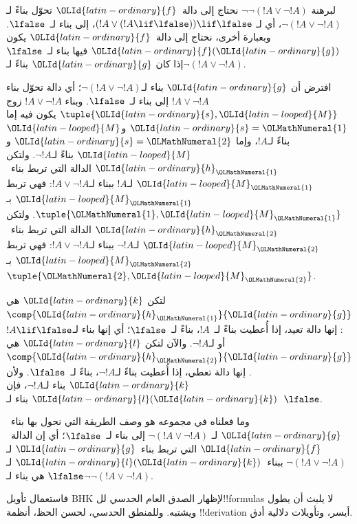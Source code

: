 \documentclass[../../../include/open-logic-section]{subfiles}
\begin{document}
\begin{ex}
لبرهنة $\lnot \lnot (!A \lor \lnot !A)$ نحتاج إلى دالة~${\OLId{latin-ordinary}{f}}$ تحوّل
بناءً لـ$\lnot(!A \lor \lnot !A)$، أي لـ
$(!A \lor (!A \lif \lfalse)) \lif \lfalse$، إلى بناء لـ~$\lfalse$.
وبعبارة أخرى، نحتاج إلى دالة~${\OLId{latin-ordinary}{f}}$ يكون ${\OLId{latin-ordinary}{f}}({\OLId{latin-ordinary}{g}})$ فيها بناء لـ~$\lfalse$
إذا كان ${\OLId{latin-ordinary}{g}}$ بناءً لـ$\lnot(!A \lor \lnot !A)$.

افترض أن ${\OLId{latin-ordinary}{g}}$ بناء لـ$\lnot(!A \lor \lnot !A)$؛ أي دالة تحوّل بناء
$!A \lor \lnot !A$ إلى بناء لـ~$\lfalse$. وبناء
$!A \lor \lnot !A$ زوج $\tuple{{\OLId{latin-ordinary}{s}}, {\OLId{latin-looped}{M}}}$ يكون فيه إما ${\OLId{latin-ordinary}{s}} = {\OLMathNumeral{1}}$ و${\OLId{latin-looped}{M}}$
بناءً لـ$!A$، وإما ${\OLId{latin-ordinary}{s}} = {\OLMathNumeral{2}}$ و${\OLId{latin-looped}{M}}$ بناءً لـ$\lnot !A$. ولتكن ${\OLId{latin-ordinary}{h}}_{\OLMathNumeral{1}}$
الدالة التي تربط بناء~${\OLId{latin-looped}{M}}_{\OLMathNumeral{1}}$ لـ$!A$ ببناء لـ$!A \lor \lnot !A$:
فهي تربط ${\OLId{latin-looped}{M}}_{\OLMathNumeral{1}}$ بـ$\tuple{{\OLMathNumeral{1}}, {\OLId{latin-looped}{M}}_{\OLMathNumeral{1}}}$. ولتكن ${\OLId{latin-ordinary}{h}}_{\OLMathNumeral{2}}$ الدالة التي تربط
بناء~${\OLId{latin-looped}{M}}_{\OLMathNumeral{2}}$ لـ$\lnot !A$ ببناء لـ$!A \lor \lnot !A$: فهي تربط
${\OLId{latin-looped}{M}}_{\OLMathNumeral{2}}$ بـ$\tuple{{\OLMathNumeral{2}}, {\OLId{latin-looped}{M}}_{\OLMathNumeral{2}}}$.

لتكن ${\OLId{latin-ordinary}{k}}$ هي $\comp{{\OLId{latin-ordinary}{h}}_{\OLMathNumeral{1}}}{{\OLId{latin-ordinary}{g}}}$: إنها دالة تعيد، إذا أُعطيت بناءً لـ~$!A$،
بناءً لـ~$\lfalse$؛ أي إنها بناء لـ$!A \lif \lfalse$ أو لـ$\lnot !A$.
والآن لتكن ${\OLId{latin-ordinary}{l}}$ هي $\comp{{\OLId{latin-ordinary}{h}}_{\OLMathNumeral{2}}}{{\OLId{latin-ordinary}{g}}}$. إنها دالة تعطي، إذا أُعطيت بناءً
لـ$\lnot !A$، بناءً لـ~$\lfalse$. ولأن ${\OLId{latin-ordinary}{k}}$ بناء لـ$\lnot !A$، فإن
${\OLId{latin-ordinary}{l}}({\OLId{latin-ordinary}{k}})$ بناء لـ~$\lfalse$.

وما فعلناه في مجموعه هو وصف الطريقة التي نحول بها بناء~${\OLId{latin-ordinary}{g}}$ لـ
$\lnot(!A \lor \lnot !A)$ إلى بناء لـ~$\lfalse$؛ أي إن الدالة~${\OLId{latin-ordinary}{f}}$
التي تربط بناء~${\OLId{latin-ordinary}{g}}$ لـ$\lnot(!A \lor \lnot !A)$ ببناء~${\OLId{latin-ordinary}{l}}({\OLId{latin-ordinary}{k}})$ لـ
$\lfalse$ هي بناء لـ$\lnot\lnot(!A \lor \lnot !A)$.
\end{ex}

فاستعمال تأويل BHK لإظهار الصدق العام الحدسي لل!!{formula}s لا يلبث أن
يطول ويشتبه. وللمنطق الحدسي، لحسن الحظ، أنظمة !!{derivation} أيسر،
وتأويلات دلالية أدق.
\end{document}
